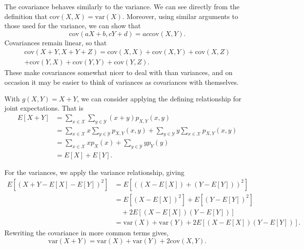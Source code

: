 \documentclass[
  letterpaper,
  DIV=11,
  numbers=noendperiod]{scrreprt}
\theoremstyle{definition}
\theoremstyle{definition}
\theoremstyle{definition}
\theoremstyle{remark}
\begin{document}
The covariance behaves similarly to the variance. We can see directly
from the definition that \(\text{cov}(X,X) = \text{var}(X)\). Moreover,
using similar arguments to those used for the variance, we can show that
\[\text{cov}(aX+b,cY+d) = ac\text{cov}(X,Y).\] Covariances remain
linear, so that
\begin{multline*}\text{cov}(X+Y,X+Y+Z)=\text{cov}(X,X)+\text{cov}(X,Y)+\text{cov}(X,Z)\\ +\text{cov}(Y,X)+\text{cov}(Y,Y)+\text{cov}(Y,Z).\end{multline*}
These make covariances somewhat nicer to deal with than variances, and
on occasion it may be easier to think of variances as covariances with
themselves.

\begin{tcolorbox}[enhanced jigsaw, coltitle=black, colframe=quarto-callout-warning-color-frame, colbacktitle=quarto-callout-warning-color!10!white, bottomrule=.15mm, opacitybacktitle=0.6, colback=white, toptitle=1mm, arc=.35mm, leftrule=.75mm, bottomtitle=1mm, opacityback=0, breakable, rightrule=.15mm, title={Proofs for the Expectation and Variance of Linear Combinations of Random
Variables}, left=2mm, titlerule=0mm, toprule=.15mm]

With \(g(X,Y) = X+Y\), we can consider applying the defining
relationship for joint expectations. That is \begin{align*}
E[X+Y] &= \sum_{x\in\mathcal{X}}\sum_{y\in\mathcal{Y}}(x+y)p_{X,Y}(x,y) \\
&= \sum_{x\in\mathcal{X}}x\sum_{y\in\mathcal{Y}}p_{X,Y}(x,y) + \sum_{y\in\mathcal{Y}}y\sum_{x\in\mathcal{X}}p_{X,Y}(x,y) \\
&= \sum_{x\in\mathcal{X}}xp_X(x) + \sum_{y\in\mathcal{Y}}yp_Y(y) \\
&= E[X] + E[Y].\end{align*}

For the variances, we apply the variance relationship, giving
\begin{align*}
E[(X+Y-E[X]-E[Y])^2] &= E[((X-E[X])+(Y-E[Y]))^2] \\
&= E[(X-E[X])^2] + E[(Y-E[Y])^2] \\
&\quad+ 2E[(X-E[X])(Y-E[Y])] \\
&= \text{var}(X) + \text{var}(Y) + 2E[(X-E[X])(Y-E[Y])].\end{align*}
Rewriting the covariance in more common terms gives,
\[\text{var}(X+Y) = \text{var}(X) + \text{var}(Y) + 2\text{cov}(X,Y).\]

\end{tcolorbox}
\end{document}
